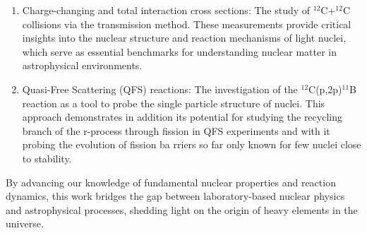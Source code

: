 \begin{enumerate}
\item Charge-changing and total interaction cross sections: The study of $^{12}$C+$^{12}$C collisions via the transmission method. These measurements provide critical insights into the nuclear structure and reaction mechanisms of light nuclei, which serve as essential benchmarks for understanding nuclear matter in astrophysical environments.
\item Quasi-Free Scattering (QFS) reactions: The investigation of the $^{12}$C(p,2p)$^{11}$B reaction as a tool to probe the single particle structure of nuclei. This approach demonstrates in addition its potential for studying the recycling branch of the r-process through fission in QFS experiments and with it probing the evolution of fission ba
rriers so far only known for few nuclei close to stability. 
\end{enumerate}
By advancing our knowledge of fundamental nuclear properties and reaction dynamics, this work bridges the gap between laboratory-based nuclear physics and astrophysical processes, shedding light on the origin of heavy elements in the universe.
